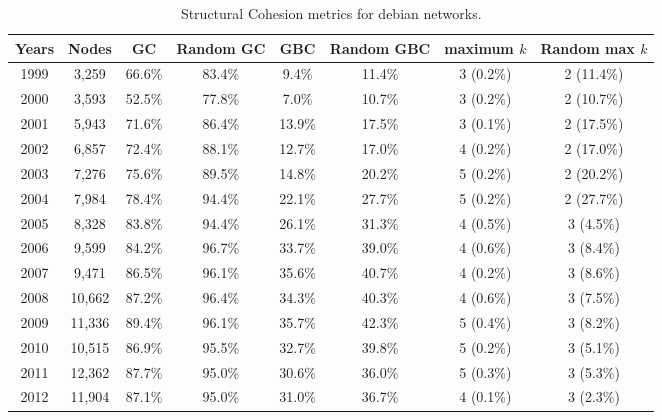 \begin{table}[H]
\begin{center}
\begin{tabular}{|c|c|c|c|c|c|c|c|}
\hline
Years&Nodes&GC&Random GC&GBC&Random GBC&maximum $k$&Random max $k$\\
\hline
1999&3,259&66.6\%&83.4\%&9.4\%&11.4\%&3 (0.2\%)&2 (11.4\%)\\
2000&3,593&52.5\%&77.8\%&7.0\%&10.7\%&3 (0.2\%)&2 (10.7\%)\\
2001&5,943&71.6\%&86.4\%&13.9\%&17.5\%&3 (0.1\%)&2 (17.5\%)\\
2002&6,857&72.4\%&88.1\%&12.7\%&17.0\%&4 (0.2\%)&2 (17.0\%)\\
2003&7,276&75.6\%&89.5\%&14.8\%&20.2\%&5 (0.2\%)&2 (20.2\%)\\
2004&7,984&78.4\%&94.4\%&22.1\%&27.7\%&5 (0.2\%)&2 (27.7\%)\\
2005&8,328&83.8\%&94.4\%&26.1\%&31.3\%&4 (0.5\%)&3 (4.5\%)\\
2006&9,599&84.2\%&96.7\%&33.7\%&39.0\%&4 (0.6\%)&3 (8.4\%)\\
2007&9,471&86.5\%&96.1\%&35.6\%&40.7\%&4 (0.2\%)&3 (8.6\%)\\
2008&10,662&87.2\%&96.4\%&34.3\%&40.3\%&4 (0.6\%)&3 (7.5\%)\\
2009&11,336&89.4\%&96.1\%&35.7\%&42.3\%&5 (0.4\%)&3 (8.2\%)\\
2010&10,515&86.9\%&95.5\%&32.7\%&39.8\%&5 (0.2\%)&3 (5.1\%)\\
2011&12,362&87.7\%&95.0\%&30.6\%&36.0\%&5 (0.3\%)&3 (5.3\%)\\
2012&11,904&87.1\%&95.0\%&31.0\%&36.7\%&4 (0.1\%)&3 (2.3\%)\\
\hline
\end{tabular}
\caption{Structural Cohesion metrics for debian networks.}
\label{str_cohesion_debian}
\end{center}
\end{table}

